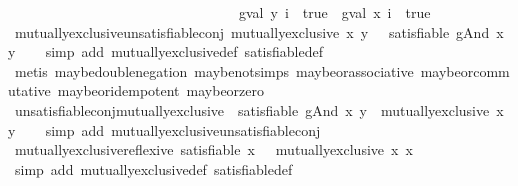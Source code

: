\begin{isabellebody}
\ \ \ \ \ \ \ \ \ \ \ \ \ \ \ \ \ \ \ \ \ \ \ \ \ \ \ \ \ \ \ \ \ {\isacharparenleft}gval\ y\ i\ {\isacharequal}\ true\ {\isasymlongrightarrow}\ gval\ x\ i\ {\isasymnoteq}\ true{\isacharparenright}{\isacharparenright}{\isachardoublequoteclose}\isanewline
\isanewline
{}\isamarkupfalse%
\ mutually{\isacharunderscore}exclusive{\isacharunderscore}unsatisfiable{\isacharunderscore}conj{\isacharcolon}\ {\isachardoublequoteopen}mutually{\isacharunderscore}exclusive\ x\ y\ {\isacharequal}\ {\isacharparenleft}{\isasymnot}\ satisfiable\ {\isacharparenleft}gAnd\ x\ y{\isacharparenright}{\isacharparenright}{\isachardoublequoteclose}\isanewline
%
\isadelimproof
\ \ %
\endisadelimproof
%
\isatagproof
{}\isamarkupfalse%
\ {\isacharparenleft}simp\ add{\isacharcolon}\ mutually{\isacharunderscore}exclusive{\isacharunderscore}def\ satisfiable{\isacharunderscore}def{\isacharparenright}\isanewline
\ \ \isamarkupfalse%
\ {\isacharparenleft}metis\ maybe{\isacharunderscore}double{\isacharunderscore}negation\ maybe{\isacharunderscore}not{\isachardot}simps{\isacharparenleft}{}{\isacharparenright}\ maybe{\isacharunderscore}or{\isacharunderscore}associative\ maybe{\isacharunderscore}or{\isacharunderscore}commutative\ maybe{\isacharunderscore}or{\isacharunderscore}idempotent\ maybe{\isacharunderscore}or{\isacharunderscore}zero{\isacharparenright}%
\endisatagproof
{\isafoldproof}%
%
\isadelimproof
\isanewline
%
\endisadelimproof
\isanewline
{}\isamarkupfalse%
\ unsatisfiable{\isacharunderscore}conj{\isacharunderscore}mutually{\isacharunderscore}exclusive{\isacharcolon}\ {\isachardoublequoteopen}{\isasymnot}\ satisfiable\ {\isacharparenleft}gAnd\ x\ y{\isacharparenright}\ {\isacharequal}\ mutually{\isacharunderscore}exclusive\ x\ y{\isachardoublequoteclose}\isanewline
%
\isadelimproof
\ \ %
\endisadelimproof
%
\isatagproof
{}\isamarkupfalse%
\ {\isacharparenleft}simp\ add{\isacharcolon}\ mutually{\isacharunderscore}exclusive{\isacharunderscore}unsatisfiable{\isacharunderscore}conj{\isacharparenright}%
\endisatagproof
{\isafoldproof}%
%
\isadelimproof
\isanewline
%
\endisadelimproof
\isanewline
{}\isamarkupfalse%
\ mutually{\isacharunderscore}exclusive{\isacharunderscore}reflexive{\isacharcolon}\ {\isachardoublequoteopen}satisfiable\ x\ {\isasymLongrightarrow}\ {\isasymnot}\ mutually{\isacharunderscore}exclusive\ x\ x{\isachardoublequoteclose}\isanewline
%
\isadelimproof
\ \ %
\endisadelimproof
%
\isatagproof
{}\isamarkupfalse%
\ {\isacharparenleft}simp\ add{\isacharcolon}\ mutually{\isacharunderscore}exclusive{\isacharunderscore}def\ satisfiable{\isacharunderscore}def{\isacharparenright}%

\end{isabellebody}
